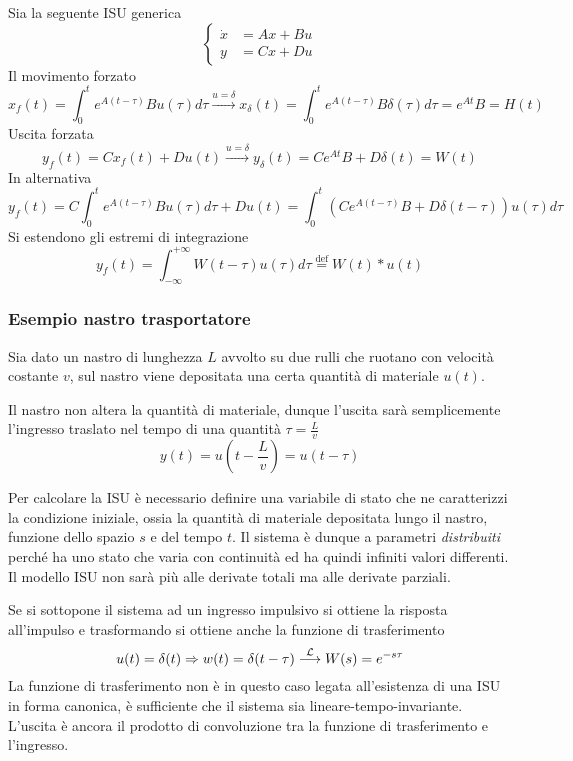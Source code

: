 Sia la seguente ISU generica
$$
\left\{\begin{aligned}
\dot{x} &= Ax+Bu \\
y &= Cx +Du
\end{aligned}\right.
$$
Il movimento forzato
$$
x_f(t) = \int_0^t e^{A(t-\tau)} Bu(\tau)d\tau
\stackrel{u=\delta}{\longrightarrow} x_\delta(t) =
\int_0^te^{A(t-\tau)}B\delta(\tau)d\tau = e^{At} B = H(t)
$$
Uscita forzata
$$
y_f(t) = Cx_f(t) +Du(t) \stackrel{u=\delta}{\longrightarrow} y_\delta(t) =
Ce^{At}B + D\delta(t) = W(t)
$$
In alternativa
$$
y_f(t) =C\int_0^t e^{A(t-\tau)} Bu(\tau) d\tau + Du(t) = \int_0^t
\left(Ce^{A(t-\tau)}B + D\delta(t-\tau)\right)u(\tau)d\tau
$$
Si estendono gli estremi di integrazione
$$
y_f(t) = \int_{-\infty}^{+\infty} W(t-\tau)u(\tau)d\tau
\stackrel{\text{def}}{=} W(t)*u(t)
$$

\subsubsection{Esempio nastro trasportatore}
Sia dato un nastro di lunghezza $L$ avvolto su due rulli che ruotano con
velocità costante $v$, sul nastro viene depositata una certa quantità di
materiale $u(t)$.

Il nastro non altera la quantità di materiale, dunque l'uscita sarà
semplicemente l'ingresso traslato nel tempo di una quantità $\tau=\frac{L}{v}$
$$
y(t) = u\left(t-\frac{L}{v}\right) = u(t-\tau)
$$

Per calcolare la ISU è necessario definire una variabile di stato che ne
caratterizzi la condizione iniziale, ossia la quantità di materiale depositata
lungo il nastro, funzione dello spazio $s$ e del tempo $t$.
Il sistema è dunque a parametri \textit{distribuiti} perché ha uno stato che
varia con continuità ed ha quindi infiniti valori differenti.
Il modello ISU non sarà più alle derivate totali ma alle derivate parziali.

Se si sottopone il sistema ad un ingresso impulsivo si ottiene la risposta
all'impulso e trasformando si ottiene anche la funzione di trasferimento
$$
u(t) = \delta(t) \Rightarrow w(t) = \delta(t-\tau)
\stackrel{\mathcal{L}}{\longrightarrow} W(s) = e^{-s\tau}
$$
La funzione di trasferimento non è in questo caso legata all'esistenza di una
ISU in forma canonica, è sufficiente che il sistema sia
lineare-tempo-invariante.
L'uscita è ancora il prodotto di convoluzione tra la funzione di trasferimento
e l'ingresso.

